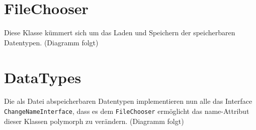 \documentclass[a4paper]{scrreprt}
\begin{document}
\section{FileChooser}
Diese Klasse kümmert sich um das Laden und Speichern der speicherbaren Datentypen.
\newline
(Diagramm folgt)
\newline

\section{DataTypes}
Die als Datei abspeicherbaren Datentypen implementieren nun alle das Interface \verb!ChangeNameInterface!, dass es dem \verb!FileChooser! ermöglicht das name-Attribut dieser Klassen polymorph zu verändern.
\newline
(Diagramm folgt)
\newline
\end{document}
